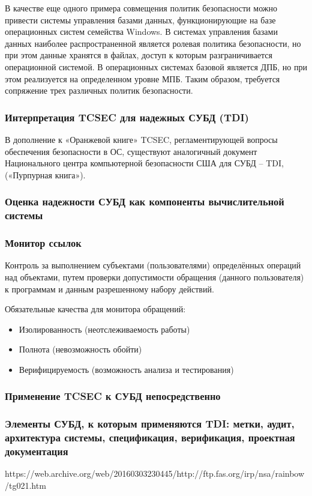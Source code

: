 В качестве еще одного примера совмещения политик безопасности можно привести системы управления базами данных, функционирующие на базе операционных систем семейства Windows. В системах управления базами данных наиболее распространенной является ролевая политика безопасности, но при этом данные хранятся в файлах, доступ к которым разграничивается операционной системой. В операционных системах базовой является ДПБ, но при этом реализуется на определенном уровне МПБ. Таким образом, требуется сопряжение трех различных политик безопасности.

\subsubsection{Интерпретация TCSEC для надежных СУБД (TDI)}
В дополнение к «Оранжевой книге» TCSEC, регламентирующей вопросы обеспечения безопасности в ОС, существуют аналогичный документ Национального центра компьютерной безопасности США для СУБД -- TDI, («Пурпурная книга»).

\subsubsection{Оценка надежности СУБД как компоненты вычислительной системы}
\subsubsection{Монитор ссылок}
Контроль за выполнением субъектами (пользователями) определённых операций над объектами, путем проверки допустимости обращения (данного пользователя) к программам и данным разрешенному набору действий.

Обязательные качества для монитора обращений:
\begin{itemize}
	\item Изолированность (неотслеживаемость работы)
	\item Полнота (невозможность обойти)
	\item Верифицируемость (возможность анализа и тестирования)
\end{itemize}

\subsubsection{Применение TCSEC к СУБД непосредственно}
\subsubsection{Элементы СУБД, к которым применяются TDI: метки, аудит, архитектура системы, спецификация, верификация, проектная документация}
https://web.archive.org/web/20160303230445/http://ftp.fas.org/irp/nsa/rainbow/tg021.htm

